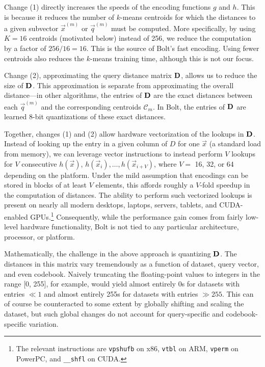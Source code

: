 Change (1) directly increases the speeds of the encoding functions $g$ and $h$. This is because it reduces the number of $k$-means centroids for which the distances to a given subvector $\vec{x}^{(m)}$ or $\vec{q}^{(m)}$ must be computed. More specifically, by using $K = 16$ centroids (motivated below) instead of 256, we reduce the computation by a factor of $256 / 16 = 16$. This is the source of Bolt's fast encoding. Using fewer centroids also reduces the $k$-means training time, although this is not our focus.

Change (2), approximating the query distance matrix $\mathbf{D}$, allows us to reduce the size of $\mathbf{D}$. This approximation is separate from approximating the overall distance---in other algorithms, the entries of $\mathbf{D}$ are the exact distances between each $\vec{q}^{(m)}$ and the corresponding centroids $\mathcal{C}_m$. In Bolt, the entries of $\mathbf{D}$ are learned 8-bit quantizations of these exact distances.

Together, changes (1) and (2) allow hardware vectorization of the lookups in $\mathbf{D}$. Instead of looking up the entry in a given column of $D$ for one $\vec{x}$ (a standard load from memory), we can leverage vector instructions to instead perform $V$ lookups for $V$ consecutive $h(\vec{x})$, $h(\vec{x}_i),\ldots,h(\vec{x}_{i+V})$, where $V = $ 16, 32, or 64 depending on the platform. Under the mild assumption that encodings can be stored in blocks of at least $V$ elements, this affords roughly a $V$-fold speedup in the computation of distances. The ability to perform such vectorized lookups is present on nearly all modern desktops, laptops, servers, tablets, and CUDA-enabled GPUs.\footnote{The relevant instructions are \texttt{vpshufb} on x86, \texttt{vtbl} on ARM, \texttt{vperm} on PowerPC, and \texttt{\_\_shfl} on CUDA.} Consequently, while the performance gain comes from fairly low-level hardware functionality, Bolt is not tied to any particular architecture, processor, or platform.

Mathematically, the challenge in the above approach is quantizing $\mathbf{D}$. The distances in this matrix vary tremendously as a function of dataset, query vector, and even codebook. Naively truncating the floating-point values to integers in the range [0, 255], for example, would yield almost entirely 0s for datasets with entries $ \ll 1$ and almost entirely 255s for datasets with entries $ \gg 255$. This can of course be counteracted to some extent by globally shifting and scaling the dataset, but such global changes do not account for query-specific and codebook-specific variation.

